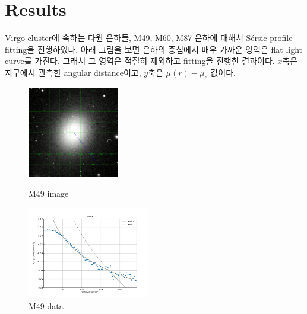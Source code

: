 \documentclass{article}
\begin{document}
\section{Results}
\quad Virgo cluster에 속하는 타원 은하들, M49, M60, M87 은하에 대해서 Sérsic profile fitting을 진행하였다.
아래 그림을 보면 은하의 중심에서 매우 가까운 영역은 flat light curve를 가진다. 
그래서 그 영역은 적절히 제외하고 fitting을 진행한 결과이다.
$x$축은 지구에서 관측한 angular distance이고, $y$축은 $\mu(r)-\mu_{e}$ 값이다.
\begin{figure}[H]
    \centering
    \begin{minipage}{0.45\textwidth}
        \centering
        \includegraphics[height=4cm]{figures/M49_image.png} 
        \caption{M49 image}
        \label{fig:M49 image}
    \end{minipage}
    \hfill
    \begin{minipage}{0.45\textwidth}
        \centering
        \includegraphics[height=4cm]{figures/M49_mu.png}
        \caption{M49 data}
        \label{fig:M49 data}
    \end{minipage}
\end{figure}
\end{document}
